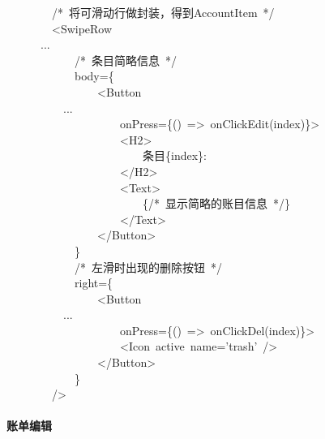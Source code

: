 \documentclass{article}
\begin{document}
\begin{mdpre}%
\noindent~~~~~~~~{/*}{~将可滑动行做封装，得到AccountItem~}{*/}\\
~~~~~~~~\textless{}SwipeRow\\
~~~~~~...\\
~~~~~~~~~~~~{/*}{~条目简略信息~}{*/}\\
~~~~~~~~~~~~body=\{\\
~~~~~~~~~~~~~~~~\textless{}Button\\
~~~~~~~~~~...\\
~~~~~~~~~~~~~~~~~~~~onPress=\{()~=\textgreater{}~onClickEdit(index)\}\textgreater{}\\
~~~~~~~~~~~~~~~~~~~~\textless{}H2\textgreater{}\\
~~~~~~~~~~~~~~~~~~~~~~~~条目\{index\}:\\
~~~~~~~~~~~~~~~~~~~~\textless{}/H2\textgreater{}\\
~~~~~~~~~~~~~~~~~~~~\textless{}Text\textgreater{}\\
~~~~~~~~~~~~~~~~~~~~~~~~\{{/*}{~显示简略的账目信息~}{*/}\}\\
~~~~~~~~~~~~~~~~~~~~\textless{}/Text\textgreater{}\\
~~~~~~~~~~~~~~~~\textless{}/Button\textgreater{}\\
~~~~~~~~~~~~\}\\
~~~~~~~~~~~~{/*}{~左滑时出现的删除按钮~}{*/}\\
~~~~~~~~~~~~right=\{\\
~~~~~~~~~~~~~~~~\textless{}Button\\
~~~~~~~~~~...\\
~~~~~~~~~~~~~~~~~~~~onPress=\{()~=\textgreater{}~onClickDel(index)\}\textgreater{}\\
~~~~~~~~~~~~~~~~~~~~\textless{}Icon~active~name={'}{trash}{'}~/\textgreater{}\\
~~~~~~~~~~~~~~~~\textless{}/Button\textgreater{}\\
~~~~~~~~~~~~\}\\
~~~~~~~~/\textgreater{}%
\end{mdpre}
\paragraph{账单编辑}\label{section}%
\end{document}
